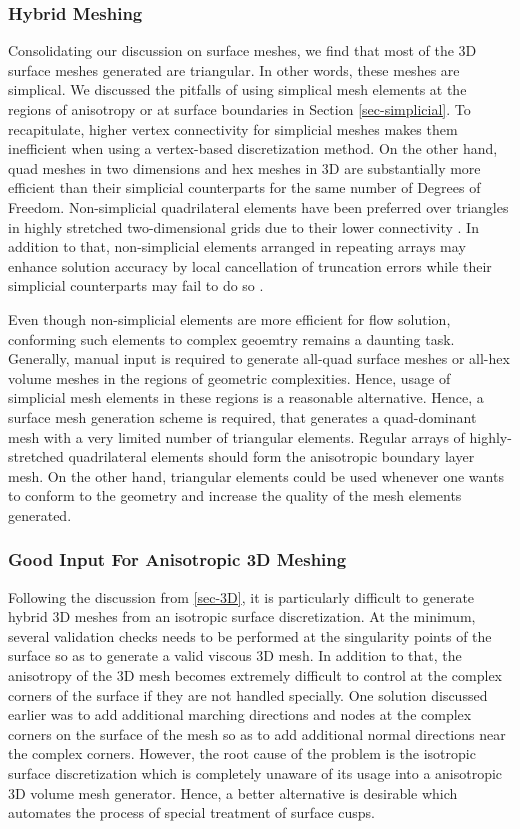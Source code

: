 \subsubsection{Hybrid Meshing}
Consolidating our discussion on surface meshes, we find that most of the 3D surface meshes generated are triangular. In other words, these meshes are simplical. We discussed the pitfalls of using simplical mesh elements at the regions of anisotropy or at surface boundaries in Section \ref{sec-simplicial}. To recapitulate, higher vertex connectivity for simplicial meshes makes them inefficient when using a vertex-based discretization method. On the other hand, quad meshes in two dimensions and hex meshes in 3D are substantially more efficient than their simplicial counterparts for the same number of Degrees of Freedom. Non-simplicial quadrilateral elements have been preferred over triangles in highly stretched two-dimensional grids due to their lower connectivity \cite{aftosmis1994accuracy}. In addition to that, non-simplicial elements arranged in repeating arrays may enhance solution accuracy by local cancellation of truncation errors while their simplicial counterparts may fail to do so \cite{mavriplis1997unstructured}.

Even though non-simplicial elements are more efficient for flow solution, conforming such elements to complex geoemtry remains a daunting task. Generally, manual input is required to generate all-quad surface meshes or all-hex volume meshes in the regions of geometric complexities. Hence, usage of simplicial mesh elements in these regions is a reasonable alternative. Hence, a surface mesh generation scheme is required, that generates a quad-dominant mesh with a very limited number of triangular elements. Regular arrays of highly-stretched quadrilateral elements should form the anisotropic boundary layer mesh. On the other hand, triangular elements could be used whenever one wants to conform to the geometry and increase the quality of the mesh elements generated.

\subsubsection{Good Input For Anisotropic 3D Meshing}
Following the discussion from \ref{sec-3D}, it is particularly difficult to generate  hybrid 3D meshes from an isotropic surface discretization. At the minimum, several validation checks needs to be performed at the singularity points of the surface so as to generate a valid viscous 3D mesh. In addition to that, the anisotropy of the 3D mesh becomes extremely difficult to control at the complex corners of the surface if they are not handled specially. One solution discussed earlier was to add additional marching directions and nodes at the complex corners on the surface of the mesh so as to add additional normal directions near the complex corners. However, the root cause of the problem is the isotropic surface discretization which is completely unaware of its usage into a anisotropic 3D volume mesh generator. Hence, a better alternative is desirable which automates the process of special treatment of surface cusps.

